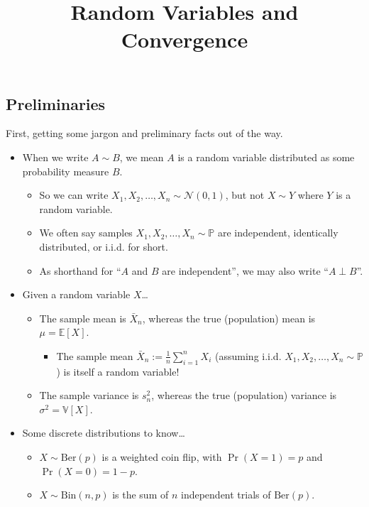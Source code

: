 \title{Random Variables and Convergence}



\subsection{Preliminaries}

First, getting some jargon and preliminary facts out of the way.
\begin{itemize}
    \item When we write $A \sim B$, we mean $A$ is a random variable
    distributed as some probability measure $B$.
    \begin{itemize}
        \item So we can write $X_1, X_2, \dots, X_n \sim \mathcal{N}(0, 1)$,
        but not $X \sim Y$ where $Y$ is a random variable.
        \item We often say samples $X_1, X_2, \dots, X_n \sim \mathbb{P}$ are
        independent, identically distributed, or i.i.d. for short.
        \item As shorthand for ``$A$ and $B$ are independent'',
        we may also write ``$A \perp B$''.
    \end{itemize}
    \item Given a random variable $X$\dots
    \begin{itemize}
        \item The sample mean is $\bar{X}_n$, whereas
        the true (population) mean is $\mu = \mathbb{E}[X]$.
        \begin{itemize}
            \item The sample mean $\bar{X}_n := \frac{1}{n}\sum_{i = 1}^n X_i$
            (assuming i.i.d. $X_1, X_2, \dots, X_n \sim \mathbb{P}$)
            is itself a random variable!
        \end{itemize}
        \item The sample variance is $s_n^2$, whereas
        the true (population) variance is $\sigma^2 = \mathbb{V}[X]$.
    \end{itemize}
    \item Some discrete distributions to know\dots
    \begin{itemize}
        \item $X \sim \text{Ber}(p)$ is a weighted coin flip,
        with $\Pr(X = 1) = p$ and $\Pr(X = 0) = 1 - p$.
        \item $X \sim \text{Bin}(n, p)$ is the sum of $n$ independent
        trials of $\text{Ber}(p)$.

\end{itemize}
\end{itemize}

